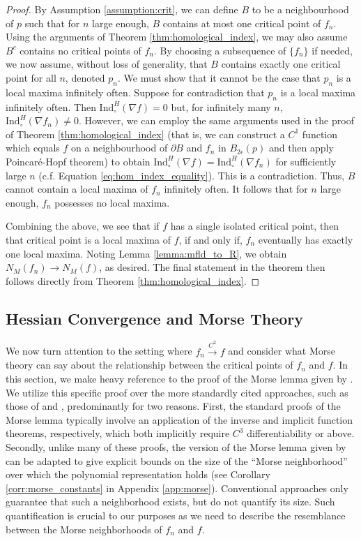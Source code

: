 \documentclass[11pt]{article}
\newcommand{\1}{\mathbf{1}}
\theoremstyle{definition}
\theoremstyle{remark}
\begin{document}
\begin{proof}
    By Assumption \ref{assumption:crit}, we can define $B$ to be a neighbourhood of $p$ such that for $n$ large enough, $B$ contains at most one critical point of $f_n$. Using the arguments of Theorem \ref{thm:homological_index}, we may also assume $B^c$ contains no critical points of $f_n$. By choosing a subsequence of $\{f_n\}$ if needed, we now assume, without loss of generality, that $B$ contains exactly one critical point for all $n$, denoted $p_n$. We must show that it cannot be the case that $p_n$ is a local maxima infinitely often. Suppose for contradiction that $p_n$ is a local maxima infinitely often. Then $\text{Ind}^H_{\circ}(\nabla f)=0$ but, for infinitely many $n$, $\text{Ind}^H_{\circ}(\nabla f_n)\neq 0$. However, we can employ the same arguments used in the proof of Theorem \ref{thm:homological_index} (that is, we can construct a $C^1$ function which equals $f$ on a neighbourhood of $\partial B$ and $f_n$ in $B_{2\epsilon}(p)$ and then apply Poincar\'{e}-Hopf theorem) to obtain $\text{Ind}^H_{\circ}(\nabla f)=\text{Ind}^H_{\circ}(\nabla f_n)$ for sufficiently large $n$ (c.f. Equation \eqref{eq:hom_index_equality}). This is a contradiction. Thus, $B$ cannot contain a local maxima of $f_n$ infinitely often. It follows that for $n$ large enough, $f_n$ possesses no local maxima.
    
    Combining the above, we see that if $f$ has a single isolated critical point, then that critical point is a local maxima of $f$, if and only if, $f_n$ eventually has exactly one local maxima. Noting Lemma \ref{lemma:mfld_to_R}, we obtain $N_M(f_n)\rightarrow N_M(f)$, as desired. The final statement in the theorem then follows directly from Theorem \ref{thm:homological_index}.
    \end{proof}

\subsection{Hessian Convergence and Morse Theory}\label{sec:morse}

We now turn attention to the setting where $f_n\xrightarrow{C^2}f$ and consider what Morse theory can say about the relationship between the critical points of $f_n$ and $f$.
In this section, we make heavy reference to the proof of the Morse lemma given by \cite{ioffe1997}. We utilize this specific proof over the more standardly cited approaches, such as those of \cite{milnor1963morse} and \cite{nirenberg1974topics}, predominantly for two reasons. First, the standard proofs of the Morse lemma typically involve an application of the inverse and implicit function theorems, respectively, which both implicitly require $C^3$ differentiability or above. Secondly, unlike many of these proofs, the version of the Morse lemma given by \cite{ioffe1997} can be adapted to give explicit bounds on the size of the ``Morse neighborhood'' over which the polynomial representation holds (see Corollary \ref{corr:morse_constants} in Appendix \ref{app:morse}). Conventional approaches only guarantee that such a neighborhood exists, but do not quantify its size. Such quantification is crucial to our purposes as we need to describe the resemblance between the Morse neighborhoods of $f_n$ and $f$.
\end{document}
